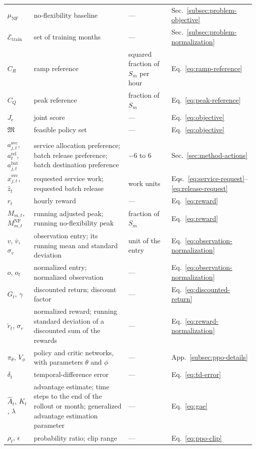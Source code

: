 \documentclass{UNCC-thesis}
\begin{document}
\begin{longtable}{@{}L{0.15\textwidth}L{0.37\textwidth}L{0.25\textwidth}L{0.13\textwidth}@{}}
  \(\mu_{\mathrm{NF}}\) & no-flexibility baseline & --- & Sec.~\ref{subsec:problem-objective} \\
  \(\mathcal E_{\mathrm{train}}\) & set of training months & --- & Sec.~\ref{subsec:problem-normalization} \\
  \(C_R\) & ramp reference & squared fraction of \(S_m\) per hour & Eq.~\eqref{eq:ramp-reference} \\
  \(C_Q\) & peak reference & fraction of \(S_m\) & Eq.~\eqref{eq:peak-reference} \\
  \(J_e\) & joint score & --- & Eq.~\eqref{eq:objective} \\
  \(\mathfrak M\) & feasible policy set & --- & Eq.~\eqref{eq:objective} \\
  \addlinespace
   \\
  \(a^{\mathrm{svc}}_{j,t}\), \(a^{\mathrm{rel}}_t\), \(a^{\mathrm{bat}}_{j,t}\) & service allocation preference; batch release preference; batch destination preference & \(-6\) to 6 & Sec.~\ref{sec:method-actions} \\
  \(\hat x^{\mathrm{svc}}_{j,t}\), \(\hat z_t\) & requested service work; requested batch release & work units & Eqs.~\eqref{eq:service-request}--\eqref{eq:release-request} \\
  \(r_t\) & hourly reward & --- & Eq.~\eqref{eq:reward} \\
  \(M_{m,t}\), \(M^{\mathrm{NF}}_{m,t}\) & running adjusted peak; running no-flexibility peak & fraction of \(S_m\) & Eq.~\eqref{eq:reward} \\
  \(v\), \(\bar v\), \(\sigma_v\) & observation entry; its running mean and standard deviation & unit of the entry & Eq.~\eqref{eq:observation-normalization} \\
  \(o\), \(o_t\) & normalized entry; normalized observation & --- & Eq.~\eqref{eq:observation-normalization} \\
  \(G_t\), \(\gamma\) & discounted return; discount factor & --- & Eq.~\eqref{eq:discounted-return} \\
  \(\widetilde r_t\), \(\sigma_r\) & normalized reward; running standard deviation of a discounted sum of the rewards & --- & Eq.~\eqref{eq:reward-normalization} \\
  \(\pi_\theta\), \(V_\phi\) & policy and critic networks, with parameters \(\theta\) and \(\phi\) & --- & App.~\ref{subsec:ppo-details} \\
  \(\delta_t\) & temporal-difference error & --- & Eq.~\eqref{eq:td-error} \\
  \(\hat A_t\), \(K_t\), \(\lambda\) & advantage estimate; time steps to the end of the rollout or month; generalized advantage estimation parameter & --- & Eq.~\eqref{eq:gae} \\
  \(\rho_t\), \(\epsilon\) & probability ratio; clip range & --- & Eq.~\eqref{eq:ppo-clip} \\
  \bottomrule
\end{longtable}
\endgroup
\end{document}
